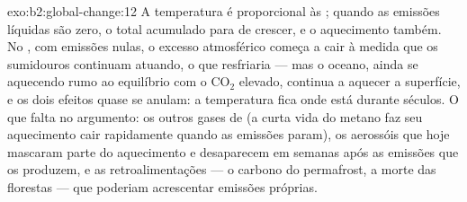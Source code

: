 \begin{solution}{exo:b2:global-change:12}
A temperatura é proporcional às ; quando as emissões
líquidas são zero, o total acumulado para de crescer, e o aquecimento
também. No , com emissões nulas, o excesso atmosférico
começa a cair à medida que os sumidouros continuam atuando, o que
resfriaria --- mas o oceano, ainda se aquecendo rumo ao equilíbrio com o
\ensuremath{\mathrm{CO_2}} elevado, continua a aquecer a superfície, e os
dois efeitos quase se anulam: a temperatura fica onde está durante
séculos. O que falta no argumento: os outros gases de  (a
curta vida do metano faz seu aquecimento cair rapidamente quando as
emissões param), os aerossóis que hoje mascaram parte do aquecimento e
desaparecem em semanas após as emissões que os produzem, e as
retroalimentações --- o carbono do permafrost, a morte das florestas ---
que poderiam acrescentar emissões próprias.
\end{solution}

